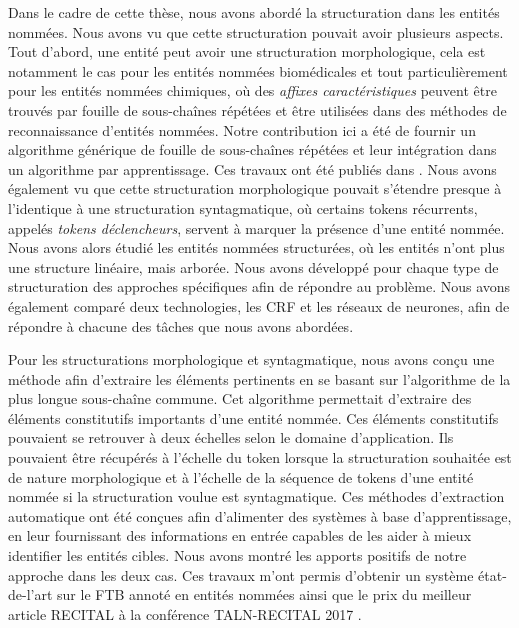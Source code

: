 \documentclass[12pt,a4paper,times,twoside,openright]{report}
\begin{document}
Dans le cadre de cette thèse, nous avons abordé la structuration dans les entités nommées. Nous avons vu que cette structuration pouvait avoir plusieurs aspects. Tout d'abord, une entité peut avoir une structuration morphologique, cela est notamment le cas pour les entités nommées biomédicales et tout particulièrement pour les entités nommées chimiques, où des \emph{affixes caractéristiques} peuvent être trouvés par fouille de sous-chaînes répétées et être utilisées dans des méthodes de reconnaissance d'entités nommées. Notre contribution ici a été de fournir un algorithme générique de fouille de sous-chaînes répétées et leur intégration dans un algorithme par apprentissage. Ces travaux ont été publiés dans \citet{dupont2016extraction}. Nous avons également vu que cette structuration morphologique pouvait s'étendre presque à l'identique à une structuration syntagmatique, où certains tokens récurrents, appelés \emph{tokens déclencheurs}, servent à marquer la présence d'une entité nommée. Nous avons alors étudié les entités nommées structurées, où les entités n'ont plus une structure linéaire, mais arborée. Nous avons développé pour chaque type de structuration des approches spécifiques afin de répondre au problème. Nous avons également comparé deux technologies, les CRF et les réseaux de neurones, afin de répondre à chacune des tâches que nous avons abordées.

Pour les structurations morphologique et syntagmatique, nous avons conçu une méthode afin d'extraire les éléments pertinents en se basant sur l'algorithme de la plus longue sous-chaîne commune. Cet algorithme permettait d'extraire des éléments constitutifs importants d'une entité nommée. Ces éléments constitutifs pouvaient se retrouver à deux échelles selon le domaine d'application. Ils pouvaient être récupérés à l'échelle du token lorsque la structuration souhaitée est de nature morphologique et à l'échelle de la séquence de tokens d'une entité nommée si la structuration voulue est syntagmatique. Ces méthodes d'extraction automatique ont été conçues afin d'alimenter des systèmes à base d'apprentissage, en leur fournissant des informations en entrée capables de les aider à mieux identifier les entités cibles. Nous avons montré les apports positifs de notre approche dans les deux cas. Ces travaux m'ont permis d'obtenir un système état-de-l'art sur le FTB annoté en entités nommées ainsi que le prix du meilleur article RECITAL à la conférence TALN-RECITAL 2017 \citep{dupont2017exploration}.
\end{document}
